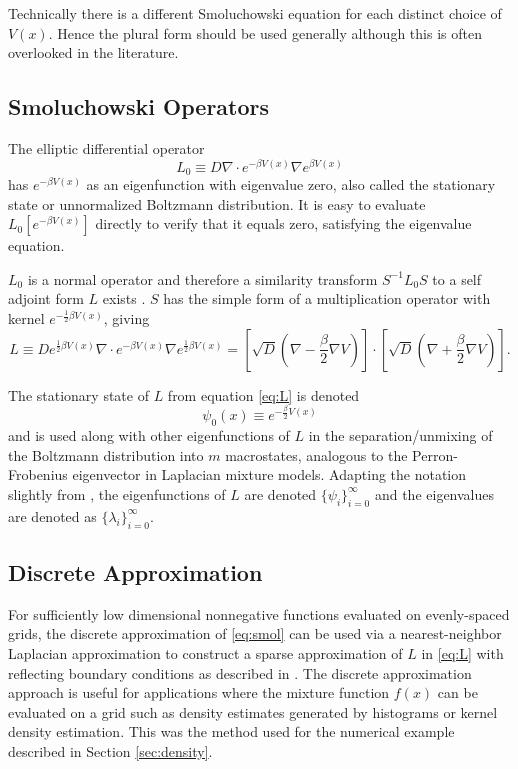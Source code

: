 \documentclass[10pt,letterpaper]{article}
\begin{document}
Technically there is a different Smoluchowski equation for each distinct choice of $V(x)$.
Hence the plural form should be used generally although this is often overlooked in the literature.
\subsection*{Smoluchowski Operators}
The elliptic differential operator
\begin{equation}
L_0 \equiv D \nabla \cdot e^{-\beta V(x)} \nabla e^{\beta V(x)}\label{eq:L0} %
\end{equation}
has $e^{-\beta V(x)}$ as an eigenfunction with eigenvalue zero, also called the stationary state or unnormalized Boltzmann distribution.
It is easy to evaluate $L_0 \left[ e^{-\beta V(x)}\right]$ directly to verify that it equals zero, satisfying the eigenvalue equation.

$L_0$ is a normal operator and therefore a similarity transform $S^{-1} L_0 S$ to a self adjoint form $L$ exists \cite{risken}.
$S$ has the simple form of a multiplication operator with kernel $e^{-\frac{1}{2}\beta V(x)}$, giving
\begin{equation}
L \equiv D e^{ \frac{1}{2}\beta V(x)} \nabla \cdot e^{-\beta V(x)} \nabla e^{ \frac{1}{2}\beta V(x)}\label{eq:L} = \left[\sqrt{D} \left(\nabla - \frac{\beta}{2} \nabla V \right) \right] \cdot \left[ \sqrt{D} \left( \nabla + \frac{\beta}{2} \nabla V \right) \right]. %
\end{equation}

The stationary state of $L$ from equation \eqref{eq:L} is denoted
\begin{equation}
\psi_0(x) \equiv e^{{ -\frac{\beta}{2} V(x)}} \label{eq:psi0}
\end{equation}
and is used along with other eigenfunctions of $L$ in the separation/unmixing of the Boltzmann distribution into $m$ macrostates, analogous to the Perron-Frobenius eigenvector in Laplacian mixture models.
Adapting the notation slightly from \cite{shall96}, the eigenfunctions of $L$ are denoted $\{\psi_i\}_{i = 0}^\infty$ and the eigenvalues are denoted as $\{\lambda_i\}_{i = 0}^\infty$.
\subsection*{Discrete Approximation}\label{sec:dapprox}
For sufficiently low dimensional nonnegative functions evaluated on evenly-spaced grids, the discrete approximation of \eqref{eq:smol} can be used via a nearest-neighbor Laplacian approximation to construct a sparse approximation of $L$ in \eqref{eq:L} with reflecting boundary conditions as described in \cite{banush}.
The discrete approximation approach is useful for applications where the mixture function $f(x)$ can be evaluated on a grid such as density estimates generated by histograms or kernel density estimation.
This was the method used for the numerical example described in Section \ref{sec:density}.
\end{document}
